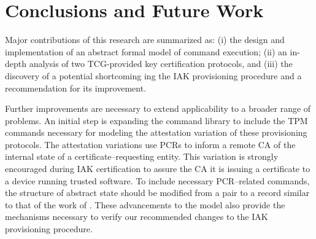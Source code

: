 \documentclass[runningheads]{llncs}
\begin{document}
\section{Conclusions and Future Work}

Major contributions of this research are summarized as: (i) the design
and implementation of an abstract formal model of command execution;
(ii) an in-depth analysis of two TCG-provided key certification
protocols, and (iii) the discovery of a potential shortcoming ing the
IAK provisioning procedure and a recommendation for its improvement.

Further improvements are necessary to extend applicability to a
broader range of problems. An initial step is expanding the command
library to include the TPM commands necessary for modeling the
attestation variation of these provisioning protocols. The
attestation variations use PCRs to inform a remote CA of the internal
state of a certificate--requesting entity. This variation is strongly
encouraged during IAK certification to assure the CA it is issuing a
certificate to a device running trusted software.  To include
necessary PCR--related commands, the structure of abstract state
should be modified from a pair to a record similar to that of the work
of \citet{PrivacyCAAnalysis-Hall}. These advancements to the model
also provide the mechanisms necessary to verify our recommended changes to
the IAK provisioning procedure.

% 
% 
%
%
%

%

%
\end{document}
